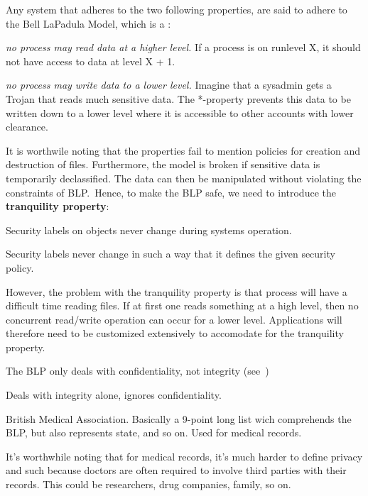 \begin{definition}
	Any system that adheres to the two following properties, are said to
	adhere to the Bell LaPadula Model, which is a :
	\begin{description}[labelindent=1cm]
		\item[Simple security property] 
			\textit{no process may read data at a higher level.}
			If a process is on runlevel X, it should not have access to data at level 
			X + 1.
		\item[*-property]
			\textit{no process may write data to a lower level.} Imagine 
			that a sysadmin gets a Trojan that reads much sensitive data. 
			The *-property prevents this data to be written down to a lower level
			where it is accessible to other accounts with lower clearance.
	\end{description}

	It is worthwile noting that the properties fail to mention policies
	for creation and destruction of files.
	Furthermore, the model is broken if sensitive data is temporarily declassified. 
	The data can then be manipulated without violating the constraints of BLP.\
	Hence, to make the BLP safe, we need to introduce the 
    \textbf{tranquility property}:
	\begin{description}[labelindent=1cm]
		\item[Strong:] 
			Security labels on objects never change during systems operation.
		\item[Weak:]
			Security labels never change in such a way that it defines the
			given security policy.
	\end{description}

	However, the problem with the tranquility property is that process will 
	have a difficult time reading files. If at first one reads something at 
	a high level, then no concurrent read/write operation can occur for a lower
	level. Applications will therefore need to be customized extensively to accomodate
	for the tranquility property.

	The BLP only deals with confidentiality, not integrity (see~)
\end{definition}

\begin{definition}
	Deals with integrity alone, ignores confidentiality.
\end{definition}

\begin{definition}
	British Medical Association. 
	Basically a 9-point long list wich comprehends the BLP,
	but also represents state, and so on. Used for medical records.

	It's worthwhile noting that for medical records, it's much harder to
	define privacy and such because doctors are often required to involve
	third parties with their records. This could be researchers, drug companies,
	family, so on.
\end{definition}

